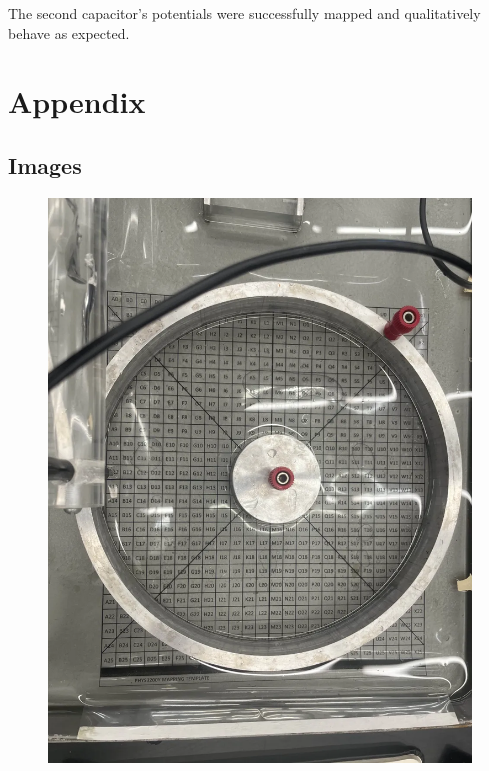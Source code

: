 \documentclass[10pt, twocolumn]{article}
\theoremstyle{definition}
\begin{document}
The second capacitor's potentials were successfully mapped and qualitatively behave as expected.
\section{Appendix}
\subsection{Images}

\begin{figure}
  \centering
  \begin{minipage}{.5\textwidth}
    \centering
    \includegraphics[scale=0.2]{cylcap.png}
    \label{fig:i1}
  \end{minipage}%
  \hspace{.1\textwidth}%
  \begin{minipage}{.5\textwidth}

\end{minipage}
\end{figure}
\end{document}
